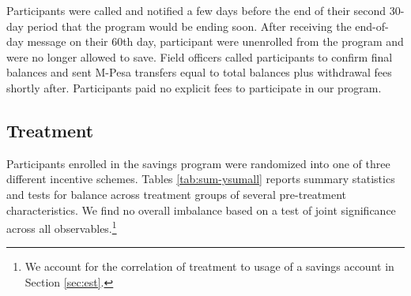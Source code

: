 \documentclass[11pt]{article}
\begin{document}
		Participants were called and notified a few days before the end of their second 30-day period that the program would be ending soon. After receiving the end-of-day message on their 60th day, participant were unenrolled from the program and were no longer allowed to save. Field officers called participants to confirm final balances and sent M-Pesa transfers equal to total balances plus withdrawal fees shortly after. Participants paid no explicit fees to participate in our program.



	\subsection{Treatment} \label{sec:treat}

		Participants enrolled in the savings program were randomized into one of three different incentive schemes. Tables \ref{tab:sum-ysumall} reports summary statistics and tests for balance across treatment groups of several pre-treatment characteristics. We find no overall  imbalance based on a test of joint significance across all observables.\footnote{We account for the correlation of treatment to usage of a savings account in Section \ref{sec:est}.}
\end{document}
